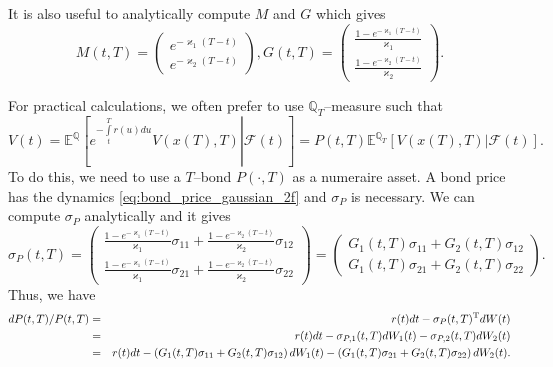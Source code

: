 \documentclass[11pt,a4paper]{article}
\theoremstyle{break} %
\numberwithin{equation}{section}
\begin{document}
It is also useful to analytically compute $M$ and $G$ which gives
\begin{equation*}
  M(t,T) = \left( {\begin{array}{*{20}{c}}
{{e^{ - {\varkappa _1}(T - t)}}}\\
{{e^{ - {\varkappa _2}(T - t)}}}
\end{array}} \right),G(t,T) = \left( {\begin{array}{*{20}{c}}
{\frac{{1 - {e^{ - {\varkappa _1}(T - t)}}}}{{{\varkappa _1}}}}\\
{\frac{{1 - {e^{ - {\varkappa _2}(T - t)}}}}{{{\varkappa _2}}}}
\end{array}} \right).
\end{equation*}

For practical calculations, we often prefer to use $\mathbb{Q}_T$--measure such that
\begin{equation*}
  V(t) = {\mathbb{E}^\mathbb{Q}}\left[ {\left. {{e^{ - \int\limits_t^T {r(u)du} }}V(x(T),T)} \right|{\mathcal F}(t)} \right] = P(t,T){\mathbb{E}^{{\mathbb{Q}_T}}}\left[ {\left. {V(x(T),T)} \right|{\mathcal F}(t)} \right].
\end{equation*}
To do this, we need to use a $T$--bond $P(\cdot, T)$ as a numeraire asset. A bond price has the dynamics \eqref{eq:bond_price_gaussian_2f} and $\sigma_P$ is necessary. We can compute $\sigma_P$ analytically and it gives
\begin{equation*}
  {\sigma _P}(t,T) = \left( {\begin{array}{*{20}{c}}
{\frac{{1 - {e^{ - {\varkappa_1}(T - t)}}}}{{{\varkappa_1}}}{\sigma _{11}} + \frac{{1 - {e^{ - {\varkappa_2}(T - t)}}}}{{{\varkappa_2}}}{\sigma _{12}}}\\
{\frac{{1 - {e^{ - {\varkappa_1}(T - t)}}}}{{{\varkappa_1}}}{\sigma _{21}} + \frac{{1 - {e^{ - {\varkappa_2}(T - t)}}}}{{{\varkappa_2}}}{\sigma _{22}}}
\end{array}} \right) = \left( {\begin{array}{*{20}{c}}
{{G_1}(t,T){\sigma _{11}} + {G_2}(t,T){\sigma _{12}}}\\
{{G_1}(t,T){\sigma _{21}} + {G_2}(t,T){\sigma _{22}}}
\end{array}} \right).
\end{equation*}
Thus, we have
\begin{eqnarray*}
dP(t,T)/P(t,T) &=& r(t)dt - {\sigma _P}{(t,T)^{\rm{T}}}dW(t)\\
 &=& r(t)dt - {\sigma _{P,1}}(t,T)d{W_1}(t) - {\sigma _{P,2}}(t,T)d{W_2}(t)\\
 &=& r(t)dt - \left( {{G_1}(t,T){\sigma _{11}} + {G_2}(t,T){\sigma _{12}}} \right)d{W_1}(t) - \left( {{G_1}(t,T){\sigma _{21}} + {G_2}(t,T){\sigma _{22}}} \right)d{W_2}(t).
\end{eqnarray*}
\end{document}
